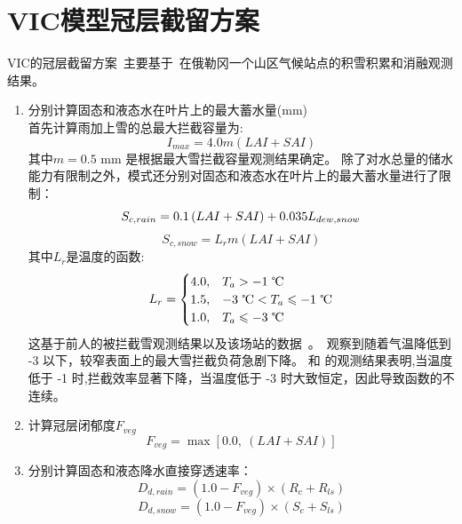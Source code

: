 \section{VIC模型冠层截留方案}
VIC的冠层截留方案~\citep{liang1994simple,hamman2018variable}主要基于~\citet{storck2002measurement}在俄勒冈一个山区气候站点的积雪积累和消融观测结果。
\begin{enumerate}
\item 分别计算固态和液态水在叶片上的最大蓄水量(mm)\\
首先计算雨加上雪的总最大拦截容量为:
\begin{equation}
I_{max} = 4.0 m (LAI+SAI)
\end{equation}
其中$m=0.5$ mm 是根据最大雪拦截容量观测结果确定。
除了对水总量的储水能力有限制之外，模式还分别对固态和液态水在叶片上的最大蓄水量进行了限制：
\begin{equation}
S_{c,rain}=0.1\left(LAI+SAI\right)+0.035 L_{dew,snow}\\
\end{equation}
\begin{equation}
S_{c,snow}=L_r m (LAI+SAI)
\end{equation}
其中$L_r$是温度的函数:
\begin{equation}
L_r = \begin{cases}
           4.0, & T_a > -1 \text{ \textcelsius}\\
            1.5, & -3 \text{ \textcelsius} < T_a \leqslant -1 \text{ \textcelsius}\\
           1.0, & T_a \leqslant -3 \text{ \textcelsius}
         \end{cases}
\end{equation}
这基于前人的被拦截雪观测结果以及该场站的数据~\citep{storck2002measurement}。\citet{kobayashi1987snow}~观察到随着气温降低到 -3 \textcelsius 以下，较窄表面上的最大雪拦截负荷急剧下降。 \citet{kobayashi1987snow}和 \citet{pfister1999snow}的观测结果表明,当温度低于 -1 \textcelsius 时,拦截效率显著下降，当温度低于 -3 \textcelsius 时大致恒定，因此导致函数的不连续。

\item 计算冠层闭郁度$F_{veg}$
\begin{equation}
F_{veg} = \max\left[0.0,\ (LAI+SAI)\right]
\end{equation}

\item 分别计算固态和液态降水直接穿透速率：
\begin{equation}
D_{d,rain}=\left(1.0-F_{veg}\right) \times (R_{c}+R_{ls})
\end{equation}
\begin{equation}
D_{d,snow}=\left(1.0-F_{veg}\right) \times (S_{c}+S_{ls})
\end{equation}


\end{enumerate}
